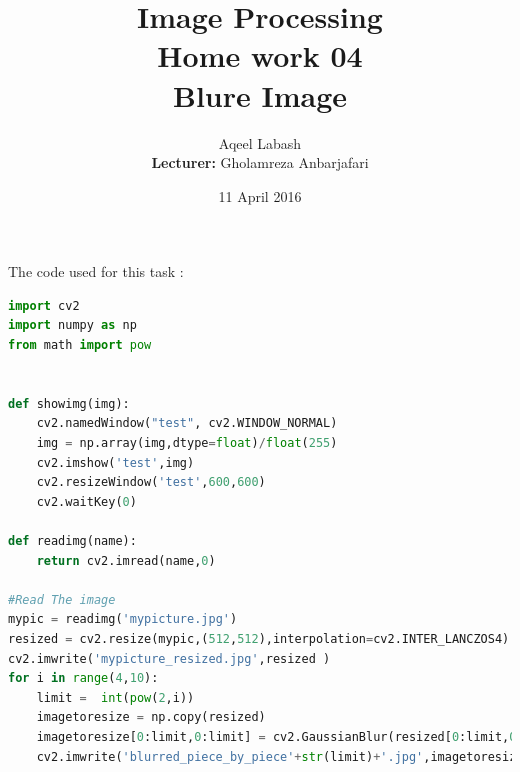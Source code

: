 \documentclass{article}
\title{Image Processing\\
	Home work 04\\Blure Image  }
\author{Aqeel Labash\\ \textbf{Lecturer:} Gholamreza Anbarjafari}
\date{11 April 2016}
\begin{document}
	\maketitle
	
The code used for this task :
	\begin{lstlisting}[language=Python]
import cv2
import numpy as np
from math import pow


def showimg(img):
	cv2.namedWindow("test", cv2.WINDOW_NORMAL)
	img = np.array(img,dtype=float)/float(255)
	cv2.imshow('test',img)
	cv2.resizeWindow('test',600,600)
	cv2.waitKey(0)

def readimg(name):
	return cv2.imread(name,0)
	
#Read The image
mypic = readimg('mypicture.jpg')
resized = cv2.resize(mypic,(512,512),interpolation=cv2.INTER_LANCZOS4)
cv2.imwrite('mypicture_resized.jpg',resized )
for i in range(4,10):
	limit =  int(pow(2,i))
	imagetoresize = np.copy(resized)
	imagetoresize[0:limit,0:limit] = cv2.GaussianBlur(resized[0:limit,0:limit],(5,5),30)
	cv2.imwrite('blurred_piece_by_piece'+str(limit)+'.jpg',imagetoresize)
	\end{lstlisting}
	
	\listoffigures
	
\end{document}
